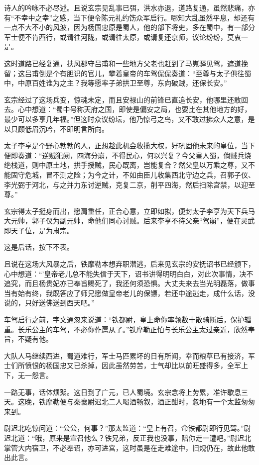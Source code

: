 \documentclass[12pt,oneside]{book}
\begin{document}
诗人的吟咏不必尽述。且说玄宗见乱事已弭，洪水亦退，道路复通，虽然悲痛，亦有``不幸中之幸''之感，当下便令陈元礼约饬众军启行。哪知大乱虽然平息，却还有一点不大不小的风波，因为杨国忠原是蜀人，他的部下将吏，多在蜀中，有一部分军士便不肯西行，或请往河陇，或请往太原，或请复还京师，议论纷纷，莫衷一是。

这时道路已经复通，扶风郡守吕甫和一些地方父老也赶到了马嵬驿见驾，遮道挽留；这吕甫倒是个有胆识的官儿，攀着皇帝的车驾侃侃奏道：``至尊与太子俱往蜀中，中原百姓谁为之主？我等愿率子弟拱卫至尊，东向破贼，还保长安。''

玄宗经过了这场兵变，惊魂未定，而且安禄山的前锋已直追长安，他哪里还敢回去。心中想道：``蜀中号称天府之国，即使是偏安之局，也要比在其他地方的好，最少可以多享几年福。''但这时众议纷坛，他乃惊弓之鸟，又不敢过拂众人之意，是以只顾低眉沉吟，不即明言所向。

太子李亨是个野心勃勃的人，正想趁此机会收揽大权，好巩固他未来的皇位，当下便即奏道：``逆贼犯阙，四海分崩，不得民心，何以兴复？今父皇人蜀，倘贼兵烧绝栈道，则中原土地，拱手授贼，民心既离，岂能复合？然父皇以万乘之尊，又不能固守危城，冒不测之险；为今之计，不如由臣儿收集西北守边之兵，召郭子仪、李光弼于河北，与之并力东讨逆贼，克复二京，削平四海，然后扫除宫禁，以迎至尊。''

玄宗得太子挺身而出，愿肩重任，正合心意，立即如拟，便封太子李亨为天下兵马大元帅，郭子仪为副元帅，命他们同心讨贼。后来李亨不待父亲``驾崩''，便在灵武即天子位，是为肃宗。

这是后话，按下不表。

且说在这场大风暴之后，铁摩勒本想弃职潜逃，后来见玄宗的安抚诏书已经颁下，心中想道：``'皇帝老儿总不能失信于天下，诏书讲得明明白白，对此次事情，决不追究，而且杨贵妃亦已奉旨赐死了，我还何须恐惧。大丈夫来去当光明磊落，做事当有始有终，我既答应了师兄愿做皇帝老儿的保镖，若还中途逃走，成什么话，没说的，只好送佛送到西天吧。''

车驾启行之前，字文通忽来说道：``铁都尉，皇上命你率领数十散骑断后，保护辎重。长乐公主的车驾，不必你作扈从了。''铁摩勒正怕与长乐公主太过亲近，欣然奉旨，不疑有他。

大队人马继续西进，蜀道难行，军士马匹累坏的日有所闻，幸而粮草已有接济，军士们所愤恨的杨国忠又已杀掉，因此虽然劳苦，士气却比以前旺盛得多，全军上下，无一怨言。

一路无事，话体烦絮。这日到了广元，已人蜀境。玄宗念将上劳累，准许歇息三天。这晚，铁摩勒便与秦襄尉迟北二人喝酒畅叙，酒正酣时，忽地有一个太监匆匆来到。

尉迟北吃惊问道：``公公，何事？''那太监道：``皇上有召，命铁都尉即行见驾。''尉迟北道：``哦，原来是宣召他么？铁兄弟，反正我也没事，陪你走一遭吧。''尉迟北掌管大内宿卫，不必奉诏，亦可进宫，这时虽是在走难途中，旧规仍在，故此他敢出此言。
\end{document}
